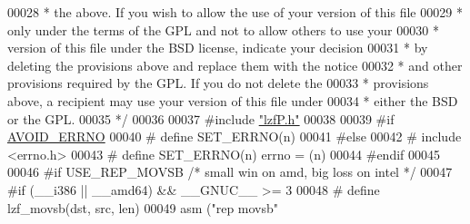 \begin{DoxyCode}
00028 \textcolor{comment}{ * the above. If you wish to allow the use of your version of this file}
00029 \textcolor{comment}{ * only under the terms of the GPL and not to allow others to use your}
00030 \textcolor{comment}{ * version of this file under the BSD license, indicate your decision}
00031 \textcolor{comment}{ * by deleting the provisions above and replace them with the notice}
00032 \textcolor{comment}{ * and other provisions required by the GPL. If you do not delete the}
00033 \textcolor{comment}{ * provisions above, a recipient may use your version of this file under}
00034 \textcolor{comment}{ * either the BSD or the GPL.}
00035 \textcolor{comment}{ */}
00036 
00037 \textcolor{preprocessor}{#}\textcolor{preprocessor}{include} \hyperlink{lzfP_8h}{"lzfP.h"}
00038 
00039 \textcolor{preprocessor}{#}\textcolor{preprocessor}{if} \hyperlink{lzfP_8h_ab79b1248963e926daff345624578d082}{AVOID\_ERRNO}
00040 \textcolor{preprocessor}{#} \textcolor{preprocessor}{define} \textcolor{preprocessor}{SET\_ERRNO}\textcolor{preprocessor}{(}\textcolor{preprocessor}{n}\textcolor{preprocessor}{)}
00041 \textcolor{preprocessor}{#}\textcolor{preprocessor}{else}
00042 \textcolor{preprocessor}{#} \textcolor{preprocessor}{include} \textcolor{preprocessor}{<}\textcolor{preprocessor}{errno}\textcolor{preprocessor}{.}\textcolor{preprocessor}{h}\textcolor{preprocessor}{>}
00043 \textcolor{preprocessor}{#} \textcolor{preprocessor}{define} \textcolor{preprocessor}{SET\_ERRNO}\textcolor{preprocessor}{(}\textcolor{preprocessor}{n}\textcolor{preprocessor}{)} errno \textcolor{preprocessor}{=} \textcolor{preprocessor}{(}\textcolor{preprocessor}{n}\textcolor{preprocessor}{)}
00044 \textcolor{preprocessor}{#}\textcolor{preprocessor}{endif}
00045 
00046 \textcolor{preprocessor}{#}\textcolor{preprocessor}{if} \textcolor{preprocessor}{USE\_REP\_MOVSB} \textcolor{comment}{/* small win on amd, big loss on intel */}
00047 \textcolor{preprocessor}{#}\textcolor{preprocessor}{if} \textcolor{preprocessor}{(}\textcolor{preprocessor}{\_\_i386} \textcolor{preprocessor}{||} \textcolor{preprocessor}{\_\_amd64}\textcolor{preprocessor}{)} \textcolor{preprocessor}{&&} \textcolor{preprocessor}{\_\_GNUC\_\_} \textcolor{preprocessor}{>=} 3
00048 \textcolor{preprocessor}{#} \textcolor{preprocessor}{define} \textcolor{preprocessor}{lzf\_movsb}\textcolor{preprocessor}{(}\textcolor{preprocessor}{dst}\textcolor{preprocessor}{,} \textcolor{preprocessor}{src}\textcolor{preprocessor}{,} \textcolor{preprocessor}{len}\textcolor{preprocessor}{)}
00049    \textcolor{preprocessor}{asm} \textcolor{preprocessor}{(}\textcolor{stringliteral}{"rep movsb"}

\end{DoxyCode}
